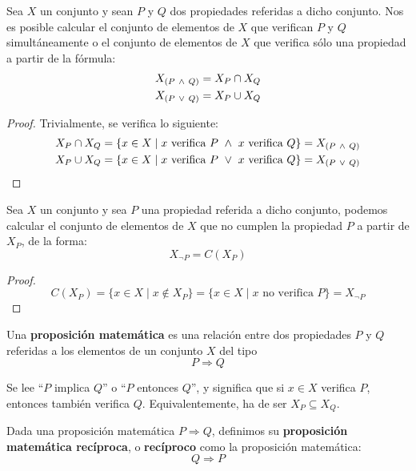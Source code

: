 \begin{prop}
    Sea $X$ un conjunto y sean $P$ y $Q$ dos propiedades referidas a dicho conjunto. Nos es posible calcular el conjunto de elementos de $X$ que verifican $P$ y $Q$ simultáneamente o el conjunto de elementos de $X$ que verifica sólo una propiedad a partir de la fórmula:
    \begin{gather*}
        X_{(P \ \land \  Q)} = X_P \cap X_Q \\
        X_{(P \ \lor \  Q)} = X_P \cup X_Q
    \end{gather*}
\end{prop}
\begin{proof} Trivialmente, se verifica lo siguiente:
    \begin{gather*}
        X_P \cap X_Q = \{x \in X \mid x \mbox{ verifica } P \ \land \  x \mbox{ verifica } Q\} = X_{(P \ \land \  Q)} \\
        X_P \cup X_Q = \{x \in X \mid x \mbox{ verifica } P \ \lor \  x \mbox{ verifica } Q\} = X_{(P \ \lor \  Q)}
    \end{gather*}
\end{proof}

\begin{prop}
    Sea $X$ un conjunto y sea $P$ una propiedad referida a dicho conjunto, podemos calcular el conjunto de elementos de $X$ que no cumplen la propiedad $P$ a partir de $X_P$, de la forma:
    $$X_{\neg P} = C(X_P)$$
\end{prop}
\begin{proof}
    $$C(X_P) = \{x \in X \mid x \notin X_P \} = \{x \in X \mid x \mbox{ no verifica } P\} = X_{\neg P}$$
\end{proof}

\begin{definicion}
    Una \textbf{proposición matemática} es una relación entre dos propiedades $P$ y $Q$ referidas a los elementos de un conjunto $X$ del tipo $$P \Longrightarrow Q$$
    
    Se lee ``$P$ implica $Q$'' o ``$P$ entonces $Q$'', y significa que si $x\in X$ verifica $P$, entonces también verifica $Q$. Equivalentemente, ha de ser $X_P\subseteq X_Q$.
\end{definicion}

\begin{definicion}[Recíproco]
    Dada una proposición matemática $P\Longrightarrow Q$, definimos su \textbf{proposición matemática recíproca}, o \textbf{recíproco} como la proposición matemática:
    \begin{equation*}
        Q\Longrightarrow P
    \end{equation*}
\end{definicion}

